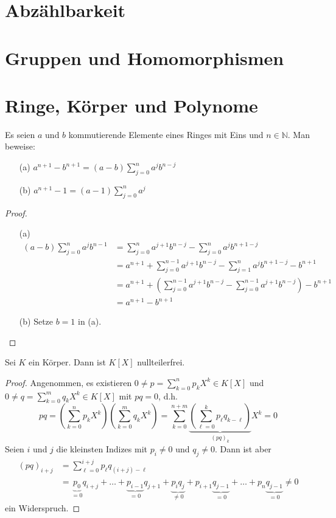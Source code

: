 \section{Abzählbarkeit}
\section{Gruppen und Homomorphismen}
\section{Ringe, Körper und Polynome}
\begin{aufgabe}
	Es seien $a$ und $b$ kommutierende Elemente eines Ringes mit Eins und $n \in \mathbb N$.
	Man beweise:
	\begin{enumerate}
		\item[(a)] $\displaystyle a^{n+1} - b^{n+1} = (a-b) \sum_{j=0}^n a^j b^{n-j} $
		\item[(b)] $\displaystyle a^{n+1} - 1 = (a-1) \sum_{j=0}^n a^j$ 
	\end{enumerate}
\end{aufgabe}
\begin{proof}
	\begin{enumerate}
		\item[(a)]
			\begin{align*}
				(a-b) \sum_{j=0}^n a^j b^{n-1}
				&= \sum_{j=0}^n a^{j+1} b^{n-j} - \sum_{j=0}^n a^j b^{n+1-j} \\
				&= a^{n+1} + \sum_{j=0}^{n-1} a^{j+1} b^{n-j} - \sum_{j=1}^n a^j b^{n+1-j} - b^{n+1} \\
				&= a^{n+1} + \left( \sum_{j=0}^{n-1} a^{j+1} b^{n-j} - \sum_{j=0}^{n-1} a^{j+1} b^{n-j}
					\right) - b^{n+1} \\
				&= a^{n+1} - b^{n+1}
			\end{align*}
		\item[(b)]
			Setze $b=1$ in (a).
	\end{enumerate}
\end{proof}

\setcounter{aufgabe}{2}
\begin{aufgabe} Sei $K$ ein Körper. Dann ist $K[X]$ nullteilerfrei. \end{aufgabe}
\begin{proof}
	Angenommen, es existieren $0 \neq p = \sum_{k=0}^n p_k X^k \in K[X]$ und
	$0 \neq q = \sum_{k=0}^m q_k X^k \in K[X]$ mit $p q = 0$, d.h.
	\[
		p q = \left( \sum_{k=0}^n p_k X^k \right) \left( \sum_{k=0}^m q_k X^k \right)
		= \sum_{k=0}^{n+m} \underbrace{ \left( \sum_{\ell = 0}^k p_\ell q_{k-\ell} \right)}_{(pq)_k} X^k
			= 0
	\]
	Seien $i$ und $j$ die kleinsten Indizes mit $p_i \neq 0$ und $q_j \neq 0$. Dann ist aber
	\begin{align*}
		(pq)_{i+j} &= \sum_{\ell = 0}^{i+j} p_{\ell} q_{(i+j)-\ell} \\
		&= \underbrace{ p_0 }_{=0} q_{i+j} + \ldots
		+ \underbrace{p_{i-1}}_{=0} q_{j+1} 
		+ \underbrace{p_i q_j}_{\neq 0}
		+ p_{i+1} \underbrace{q_{j-1}}_{=0} + \ldots
		+ p_n \underbrace{ q_{j-1} }_{=0} \neq 0
	\end{align*}
	ein Widerspruch.
\end{proof}

